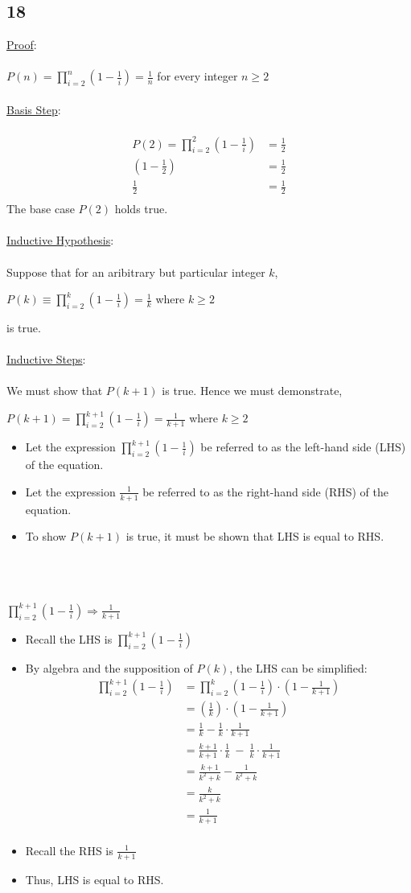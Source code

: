 \documentclass[12pt]{article}
\newcommand{\xlist}[1]{
    \begin{itemize}
        \renewcommand{\labelitemi}{$\centerdot$}
        #1
    \end{itemize}
    \newblock
    \\ \\
}
\newcommand{\xproof}[1]{
    \underline{Proof}:
    \\ \\
    #1
    \\ \\
}
\newcommand{\xbasisstep}{
    \underline{Basis Step}:
    \\ \\
}
\newcommand{\xinductivehypothesis}{
    \underline{Inductive Hypothesis}:
    \\ \\
}
\newcommand{\xinductivestep}{
    \underline{Inductive Steps}:
    \\ \\
}
\begin{document}
\subsection*{18}
\xproof{$P(n)=\prod_{i=2}^n\left(1-\frac{1}{i}\right) = \frac{1}{n}$ for every integer $n \geq 2$}
\xbasisstep
\begin{align*}
  P(2) = \prod_{i=2}^{2}\left(1-\frac{1}{i}\right) &= \frac{1}{2} \\
\left(1-\frac{1}{2}\right) &= \frac{1}{2} \\
  \frac{1}{2} &= \frac{1}{2} \\
\end{align*}
The base case $P(2)$ holds true.
\\ \\
\xinductivehypothesis
Suppose that for an aribitrary but particular integer $k$,
\begin{center}
  $P(k) \equiv \prod_{i=2}^{k}\left(1-\frac{1}{i}\right) = \frac{1}{k}$ where $k \geq 2$
\end{center}
is true.
\\ \\
\xinductivestep
We must show that $P(k+1)$ is true. Hence we must demonstrate,
\begin{center}
  $P(k+1) = \prod_{i=2}^{k+1}\left(1-\frac{1}{i}\right) = \frac{1}{k+1}$ where $k \geq 2$
\end{center}
\xlist{
  \item Let the expression $\prod_{i=2}^{k+1}\left(1-\frac{1}{i}\right)$ be referred to as the left-hand side (LHS) of the equation.
  \item Let the expression $\frac{1}{k+1}$ be referred to as the right-hand side (RHS) of the equation.
  \item To show $P(k+1)$ is true, it must be shown that LHS is equal to RHS. 
}
\\
$\prod_{i=2}^{k+1}\left(1-\frac{1}{i}\right) \Rightarrow \frac{1}{k+1}$
\xlist{
  \item Recall the LHS is $\prod_{i=2}^{k+1}\left(1-\frac{1}{i}\right)$
  \item By algebra and the supposition of $P(k)$, the LHS can be simplified:
  \begin{align*}
    \prod_{i=2}^{k+1}\left(1-\frac{1}{i}\right) &= \prod_{i=2}^{k}\left(1-\frac{1}{i}\right)\cdot\left(1-\frac{1}{k+1}\right) \\
    &= \left(\frac{1}{k}\right)\cdot\left(1-\frac{1}{k+1}\right) \\
    &= \frac{1}{k} - \frac{1}{k} \cdot \frac{1}{k+1} \\
    &= \frac{k+1}{k+1} \cdot \frac{1}{k} \ - \ \frac{1}{k} \cdot \frac{1}{k+1} \\
    & = \frac{k+1}{k^2 + k} - \frac{1}{k^2 + k} \\
    & = \frac{k}{k^2 + k} \\
    & = \frac{1}{k + 1} \\
  \end{align*}
  \item Recall the RHS is $\frac{1}{k+1}$
  \item Thus, LHS is equal to RHS.
}
\end{document}
